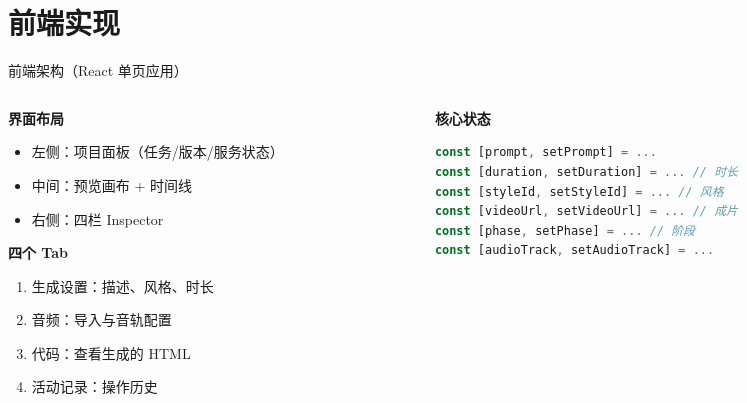 \documentclass[aspectratio=169,11pt]{beamer}
\begin{document}
\section{前端实现}

\begin{frame}[fragile]{前端架构（React 单页应用）}
  \begin{columns}[T]
    \begin{column}{0.55\textwidth}
      \textbf{界面布局}
      \begin{itemize}
        \item 左侧：项目面板（任务/版本/服务状态）
        \item 中间：预览画布 + 时间线
        \item 右侧：四栏 Inspector
      \end{itemize}
      \vspace{0.4em}
      \textbf{四个 Tab}
      \begin{enumerate}
        \item 生成设置：描述、风格、时长
        \item 音频：导入与音轨配置
        \item 代码：查看生成的 HTML
        \item 活动记录：操作历史
      \end{enumerate}
    \end{column}
    \begin{column}{0.45\textwidth}
      \textbf{核心状态}
      \begin{lstlisting}[language=JavaScript, basicstyle=\ttfamily\tiny]
const [prompt, setPrompt] = ...
const [duration, setDuration] = ... // 时长
const [styleId, setStyleId] = ... // 风格
const [videoUrl, setVideoUrl] = ... // 成片
const [phase, setPhase] = ... // 阶段
const [audioTrack, setAudioTrack] = ...
      \end{lstlisting}
    \end{column}
  \end{columns}
\end{frame}
\end{document}
